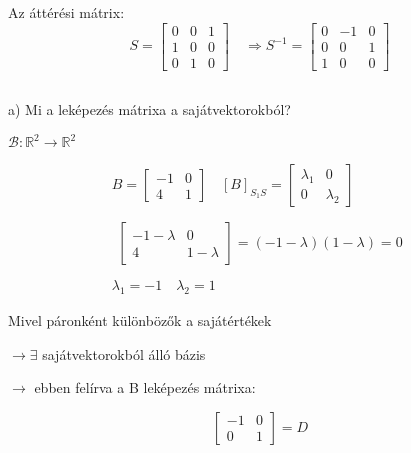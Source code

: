 Az áttérési mátrix:
$$
S=
\left[\begin{array}{ccc}
    0 & 0 & 1 \\
    1 & 0 & 0 \\
    0 & 1 & 0
\end{array}\right] \quad \Longrightarrow  S^{-1}=\left[\begin{array}{lll}0 & -1 & 0 \\0 & 0 & 1 \\1 & 0 & 0\end{array}\right]
$$

\subsection{}

a) Mi a leképezés mátrixa a sajátvektorokból?

\vspace{2mm}
$\mathcal{B}: \mathbb{R}^{2} \rightarrow \mathbb{R}^{2} \quad$ 

$$
\begin{aligned}
& B=\left[\begin{array}{cc}-1 & 0 \\4 & 1\end{array}\right] \quad[B]_{S_{1} S}=\left[\begin{array}{c|c}\lambda_{1} & 0 \\0 & \lambda_{2}\end{array}\right] \\
\\
& \begin{array}{cc}{\left[\begin{array}{cc}-1-\lambda & 0 \\4 & 1-\lambda\end{array}\right]=(-1-\lambda)(1-\lambda)=0}\\
& \end{array} \\
& \lambda_{1}=-1 \quad \lambda_{2}=1
\end{aligned}
$$

Mivel páronként különbözők a sajátértékek

$\rightarrow \exists$ sajátvektorokból álló bázis

$\rightarrow$ ebben felírva a B leképezés mátrixa:

$$
\left[\begin{array}{cc}
-1 & 0 \\
0 & 1
\end{array}\right]=D
$$